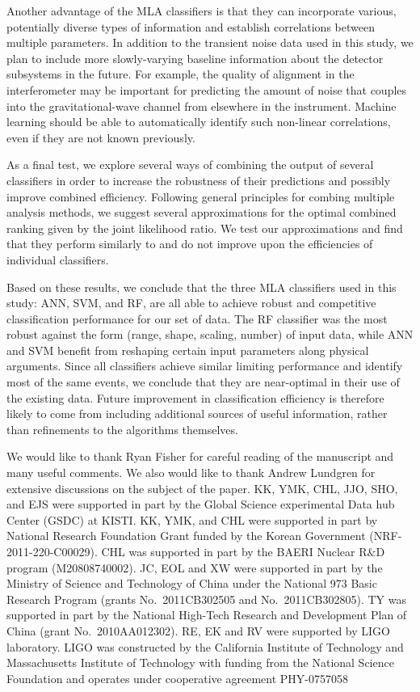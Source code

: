 \documentclass[prd, twocolumn, lengthcheck, superscriptaddress, showpacs, letterpaper, nofootinbib]{revtex4-1}
\begin{document}
Another advantage of the \ac{MLA} classifiers is that they can incorporate
various, potentially diverse types of information and establish correlations
between multiple parameters.  In addition to the transient noise data used in
this study, we plan to include more slowly-varying baseline information about
the detector subsystems in the future. For example, the quality of alignment in
the interferometer may be important for predicting the amount of noise that
couples into the gravitational-wave channel from elsewhere in the instrument.
Machine learning should be able to automatically identify such non-linear
correlations, even if they are not known previously.

As a final test, we explore several ways of combining the output of several
classifiers in order to increase the robustness of their predictions and
possibly improve combined efficiency. Following general principles for
combing multiple analysis methods, we suggest several approximations for the
optimal combined ranking given by the joint likelihood ratio. We test our
approximations and find that they perform similarly to and do not improve upon
the efficiencies of individual classifiers.

Based on these results, we conclude that the three {MLA} classifiers used in
this study: ANN, SVM, and RF, are all able to achieve robust and competitive
classification performance for our set of data. The RF classifier was the most
robust against the form (range, shape, scaling, number) of input data, while
ANN and SVM benefit from reshaping certain input parameters along physical
arguments. Since all classifiers achieve similar limiting performance and
identify most of the same events, we conclude that they are near-optimal in
their use of the existing data. Future improvement in classification efficiency
is therefore likely to come from including additional sources of useful
information, rather than refinements to the algorithms themselves.

\acknowledgments
We would like to thank Ryan Fisher for careful reading of the manuscript and many useful comments. We also would like to thank Andrew Lundgren for extensive discussions on the subject of the paper. KK, YMK, CHL, JJO, SHO, and EJS were supported in part by the Global Science experimental Data hub Center (GSDC) at KISTI. KK, YMK, and CHL were supported in part by National Research Foundation Grant funded by the Korean Government (NRF-2011-220-C00029). CHL was supported in part by the BAERI Nuclear R$\&$D program (M20808740002). JC, EOL and XW were supported in part by the Ministry of Science and Technology of China under the National 973 Basic Research Program (grants No.\ 2011CB302505 and No.\ 2011CB302805). TY was supported in part by the National High-Tech Research and Development Plan of China (grant No.\ 2010AA012302). RE, EK and RV were supported by LIGO laboratory. LIGO was constructed by the California Institute of Technology and Massachusetts Institute of Technology with funding from the National Science Foundation and operates under cooperative agreement PHY-0757058
\end{document}
